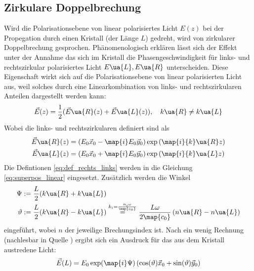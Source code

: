 \subsection{Zirkulare Doppelbrechung}
Wird die Polarisationsebene von linear polarisiertes Licht $E(z)$ bei der Propegation
durch einen Kristall (der Länge $L$) gedreht, wird von zirkularer Doppelbrechung gesprochen.
Phänomenologisch erklären lässt sich der Effekt unter der Annahme das sich im
Kristall die Phasengeschwindigkeit für links- und rechtszirkular polarisiertes
Licht $E\ua{L}, E\ua{R}$ unterscheiden. Diese Eigenschaft wirkt sich auf die Polarisationsebene
von linear polarisierten Licht aus, weil solches durch eine Linearkombination
von links- und rechtszirkularen Anteilen dargestellt werden kann:
\begin{equation}
  \label{eq:superpos_linear}
\vec{E}(z) = \frac{1}{2}( \vec{E}\ua{R}(z) + \vec{E}\ua{L}(z)), \quad k\ua{R}\neq k\ua{L}
\end{equation}
Wobei die links- und rechtszirkularen definiert sind als
\begin{align}
  \label{eq:def_rechts_links}
  \begin{aligned}
  \vec{E}\ua{R}(z) &= \left(E_0 \vec{x}_0 - \map{i}E_0\vec{y}_0\right)\exp\left(\map{i}{k}\ua{R}z\right)\\
  \vec{E}\ua{L}(z) &= \left(E_0 \vec{x}_0 + \map{i}E_0\vec{y}_0\right)\exp\left(\map{i}{k}\ua{L}z\right)
\end{aligned}
\end{align}
Die Defintionen \eqref{eq:def_rechts_links} werden in die Gleichung \eqref{eq:superpos_linear}
eingesetzt. Zusätzlich werden die Winkel
\begin{align}
  \label{eq:winkel}
  \begin{aligned}
    \Psi&:=\frac{L}{2}(k\ua{R}+k\ua{L}) \\
    \vartheta &:= \frac{L}{2}(k\ua{R}-k\ua{L}) \overset{k_i=\frac{n_i\omega}{\map{c_0}}}{=} \frac{L\omega}{2\map{c_0}}\left(n\ua{R}-n\ua{L}\right)
\end{aligned}
\end{align}
eingeführt, wobei $n$ der jeweilige Brechungsindex ist.
Nach ein wenig Rechnung (nachlesbar in Quelle \cite{anleitungv46}) ergibt sich ein
Ausdruck für das aus dem Kristall austredene Licht:
\begin{equation*}
  \vec{E}(L)=E_0 \exp(\map{i}\Psi)\left(\cos(\vartheta) \vec{x}_0 + \sin(\vartheta)\vec{y}_0\right)
\end{equation*}
